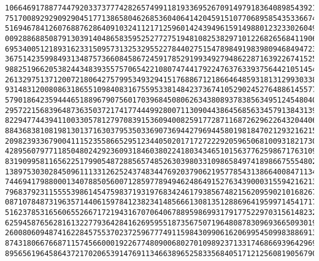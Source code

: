 \documentclass[11pt]{llncs}
\begin{document}
\begin{subappendices}
{\begin{verbatim}
1066469178877447920337377742826574991181933695267091497918364089854392183039262391590917835160240205653970\
7517008929290929045177138658046268536040641420459151077068958543533667447527529852899548554504385661263910\
5169467841260768876286409103241121712596014243949615914988012323302604935241664873668009690540503022580253\
0092886885087913039140486583595252772751948108253829710122682656841190662323010434904953320922715075445544\
6953400512189316233150957313253295522784402751547898491983980946849472304171863600101812018288349972305434\
3675142359984931348757366084586724591785291993492794862287163922674152530252243396245896594675979483293876\
9882519662053824434839355757065422108074744179224763763393756442105145442912635588510161124874921305214834\
2613297513712007218064275799534932941517688671218664648593181312993033897256815354597112618020047499280393\
9314831200808631865510984083167559533814842373674105290245276488614557715526996385085352272913099523432935\
5790186423594446518896790756017039684508062634380893783856349512454804012364368801029663757192460525897738\
2957221568396487363503721741774449928007113090443864568563345791384313987988281295492162647792435761530022\
8229477443941100330578127970839153609400825917728711687262962264320440663300044409692211867133192177593701\
8843683810819813013716303795350336907369442796944580198184702129321621587922971310761603777486510459327119\
2098239336790041115235586652951234405020171727222920596506810093182173017789351842956657267087708147399802\
4289560797711850480242923609318460380224180343465101563776259867176310949318750072922431757429976110774286\
8319099581165622517990548728856574852630398033109865849741898667555480248902390455159311671366818475253743\
1389753030284509611133126252437483447692037906219577854313866400847113429253378800186340188422282717267127\
7446941798800013407885056007128597789494624864915276343900031559421621386286951816040749879863665006223642\
7968379231155553986145475983719319768342461793856748215620959021016826718981496550260969470147755379501057\
0871078487319635714406159784123823414856661308135128869641959971454171764830607476314368599309283532459596\
5162378531656065526671721943167070640678895986993179177522970315614823290252473278902992788632382975491694\
6259458765628161322779364284162695955187356750719648087830969366509301924478254916602649933197145644072612\
2600806094874162284575537023725967774911598430990616206995450998388691312826080455593244677227883664939275\
8743180667668711574566000192267748090068027010989237133174686693964296948580295080846432971836162538329165\
8956561964586437217020653914769113466389652583356840517121256081905679039871845071608742600937525438683301\

\end{verbatim}}
\end{subappendices}
\end{document}
